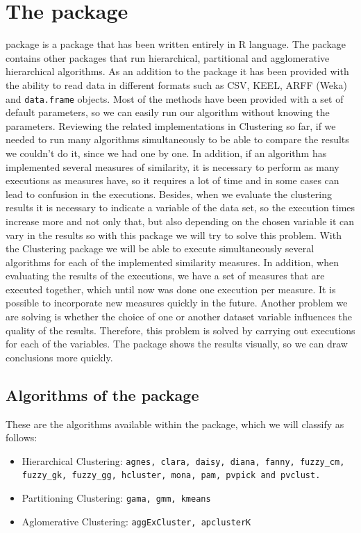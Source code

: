\section {The  package} \label{sec:seccion3}
 package is a package that has been written entirely in R language. The package contains other  packages that run hierarchical, partitional and agglomerative hierarchical algorithms. As an addition to the package it has been provided with the ability to read data in different formats such as CSV, KEEL, ARFF (Weka) and \texttt{data.frame} objects. Most of the methods have been provided with a set of default parameters, so we can easily run our algorithm without knowing the parameters. Reviewing the related implementations in Clustering so far, if we needed to run many algorithms simultaneously to be able to compare the results we couldn't do it, since we had one by one. In addition, if an algorithm has implemented several measures of similarity, it is necessary to perform as many executions as measures have, so it requires a lot of time and in some cases can lead to confusion in the executions. Besides, when we evaluate the clustering results it is necessary to indicate a variable of the data set, so the execution times increase more and not only that, but also depending on the chosen variable it can vary in the results so with this package we will try to solve this problem. With the Clustering package we will be able to execute simultaneously several algorithms for each of the implemented similarity measures. In addition, when evaluating the results of the executions, we have a set of measures that are executed together, which until now was done one execution per measure. It is possible to incorporate new measures quickly in the future. Another problem we are solving is whether the choice of one or another dataset variable influences the quality of the results. Therefore, this problem is solved by carrying out executions for each of the variables. The package shows the results visually, so we can draw conclusions more quickly.

\subsection{Algorithms of the package}
These are the algorithms available within the package, which we will classify as follows:
\begin{itemize}
  \item Hierarchical Clustering: \texttt{agnes, clara, daisy, diana, fanny, fuzzy\_cm, fuzzy\_gk, fuzzy\_gg, hcluster, mona, pam, pvpick and pvclust.}
  \item Partitioning Clustering: \texttt{gama, gmm, kmeans}
  \item Aglomerative Clustering: \texttt{aggExCluster, apclusterK}
\end{itemize}

